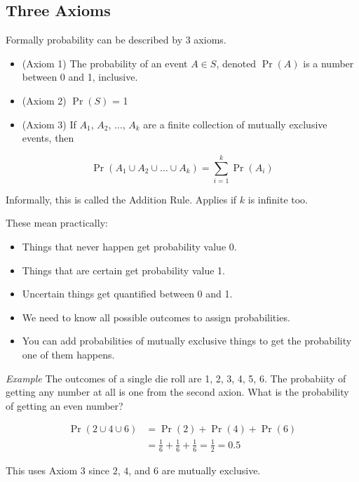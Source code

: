 \documentclass[
  oneside]{krantz}
\providecommand{\tightlist}{%
  \setlength{\itemsep}{0pt}\setlength{\parskip}{0pt}}
\begin{document}
\hypertarget{three-axioms}{%
\subsection{Three Axioms}\label{three-axioms}}

Formally probability can be described by 3 axioms.

\begin{itemize}
\item
  (Axiom 1) The probability of an event \(A \in S\), denoted \(\Pr(A)\) is a number between 0 and 1, inclusive.
\item
  (Axiom 2) \(\Pr(S)\) = 1
\item
  (Axiom 3) If \(A_1\), \(A_2\), \(\ldots\), \(A_k\) are a finite collection of mutually exclusive events, then
\end{itemize}

\[
\Pr(A_1 \cup A_2 \cup \ldots \cup A_k)  =  \sum_{i=1}^k \Pr(A_i)
\]

Informally, this is called the Addition Rule. Applies if \(k\) is infinite too.

These mean practically:

\begin{itemize}
\tightlist
\item
  Things that never happen get probability value 0.
\item
  Things that are certain get probability value 1.
\item
  Uncertain things get quantified between 0 and 1.
\item
  We need to know all possible outcomes to assign probabilities.
\item
  You can add probabilities of mutually exclusive things to get the probability one of them happens.
\end{itemize}

\emph{Example} The outcomes of a single die roll are 1, 2, 3, 4, 5, 6. The probabiity of getting any number at all is one from the second axion. What is the probability of getting an even number?

\[
\begin{aligned}
         \Pr(2 \cup 4 \cup 6) &= \Pr(2) + \Pr(4) + \Pr(6)\\ 
         &= \frac{1}{6} + \frac{1}{6} + \frac{1}{6} = \frac{1}{2} = 0.5 
\end{aligned}
\]

This uses Axiom 3 since \(2\), \(4\), and \(6\) are mutually exclusive.
\end{document}
